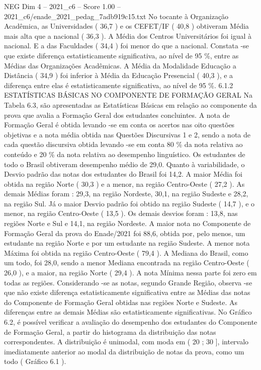 \begin{textsample}{NEG Dim 4 – 2021\_c6 – Score 1.00 – 2021\_c6/enade\_2021\_pedag\_7adb919c15.txt}
No tocante à Organização Acadêmica, as Universidades ( 36,7 ) e os CEFET/IF ( 40,8 ) obtiveram Média mais alta que a nacional ( 36,3 ).
A Média dos Centros Universitários foi igual à nacional.
E a das Faculdades ( 34,4 ) foi menor do que a nacional.
Constata -se que existe diferença estatisticamente significativa, ao nível de 95 \%, entre as Médias das Organizações Acadêmicas.
A Média da Modalidade Educação a Distância ( 34,9 ) foi inferior à Média da Educação Presencial ( 40,3 ), e a diferença entre elas é estatisticamente significativa, ao nível de 95 \%. 6.1.2 ESTATÍSTICAS BÁSICAS NO COMPONENTE DE FORMAÇÃO GERAL Na Tabela 6.3, são apresentadas as Estatísticas Básicas em relação ao componente da prova que avalia a Formação Geral dos estudantes concluintes.
A nota de Formação Geral é obtida levando -se em conta os acertos nas oito questões objetivas e a nota média obtida nas Questões Discursivas 1 e 2, sendo a nota de cada questão discursiva obtida levando -se em conta 80 \% da nota relativa ao conteúdo e 20 \% da nota relativa ao desempenho linguístico.
Os estudantes de todo o Brasil obtiveram desempenho médio de 29,0.
Quanto à variabilidade, o Desvio padrão das notas dos estudantes do Brasil foi 14,2.
A maior Média foi obtida na região Norte ( 30,3 ) e a menor, na região Centro-Oeste ( 27,2 ).
As demais Médias foram : 29,3, na região Nordeste, 30,1, na região Sudeste e 28,2, na região Sul.
Já o maior Desvio padrão foi obtido na região Sudeste ( 14,7 ), e o menor, na região Centro-Oeste ( 13,5 ).
Os demais desvios foram : 13,8, nas regiões Norte e Sul e 14,1, na região Nordeste.
A maior nota no Componente de Formação Geral da prova do Enade/2021 foi 88,6, obtida por, pelo menos, um estudante na região Norte e por um estudante na região Sudeste.
A menor nota Máxima foi obtida na região Centro-Oeste ( 79,4 ).
A Mediana do Brasil, como um todo, foi 28,0, sendo a menor Mediana encontrada na região Centro-Oeste ( 26,0 ), e a maior, na região Norte ( 29,4 ).
A nota Mínima nessa parte foi zero em todas as regiões.
Considerando -se as notas, segundo Grande Região, observa -se que não existe diferença estatisticamente significativa entre as Médias das notas do Componente de Formação Geral obtidas nas regiões Norte e Sudeste.
As diferenças entre as demais Médias são estatisticamente significativas.
No Gráfico 6.2, é possível verificar a avaliação do desempenho dos estudantes do Componente de Formação Geral, a partir do histograma da distribuição das notas correspondentes.
A distribuição é unimodal, com moda em ( 20 ; 30 ], intervalo imediatamente anterior ao modal da distribuição de notas da prova, como um todo ( Gráfico 6.1 ).

\end{textsample}
